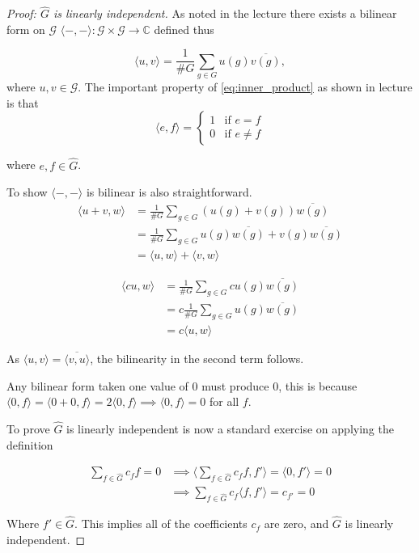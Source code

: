 \documentclass{article}
\theoremstyle{definition}
\theoremstyle{definition}
\theoremstyle{remark}
\newcommand{\bb}[1]{\mathbb{#1}} %
\renewcommand{\hat}[1]{\widehat{#1}}
\newcommand{\G}{\mathcal{G}}
\newcommand{\hG}{\hat{G}}
\begin{document}
\begin{proof}[Proof: $\hG$ is linearly independent]
	As noted in the lecture there exists a bilinear form on $\G$ $\langle -, - \rangle: \G \times \G \rightarrow \bb{C}$ defined thus

	\begin{equation}\label{eq:inner_product}
		\langle u, v \rangle = \frac{1}{\#G} \sum_{g \in G} u(g) \overline{v(g)},
	\end{equation}
	where $u, v \in \G$.
	The important property of \ref{eq:inner_product} as shown in lecture is that 
	$$
	 \langle e, f \rangle = 
	 \begin{cases}
		1 & \text{if } e = f\\ 
		0 & \text{if } e \neq f
	 \end{cases}
	$$

	where $e, f \in \hG$. 

	To show $\langle -, - \rangle$ is bilinear is also straightforward. 
	$$
	\begin{aligned}
		\langle u + v, w \rangle &= \frac{1}{\#G} \sum_{g \in G} (u(g) + v(g)) \overline{w(g)} \\
		&= \frac{1}{\#G} \sum_{g \in G} u(g) \overline{w(g)} + v(g) \overline{w(g)} \\
		&= \langle u, w \rangle + \langle v, w \rangle
	\end{aligned}
	$$

	$$
	\begin{aligned}
		\langle cu, w \rangle &= \frac{1}{\#G} \sum_{g \in G} c u(g) \overline{w(g)} \\
		&= c \frac{1}{\#G} \sum_{g \in G} u(g) \overline{w(g)} \\
		&= c \langle u, w \rangle 
	\end{aligned}
	$$

	As $\langle u, v \rangle = \overline{\langle v, u \rangle}$, the bilinearity in the second term follows. 

	Any bilinear form taken one value of 0 must produce 0, this is because $\langle 0, f \rangle = \langle 0 + 0, f \rangle = 2 \langle 0, f \rangle \implies \langle 0, f \rangle = 0 $ for all $f$.

	To prove $\hG$ is linearly independent is now a standard exercise on applying the definition

	\begin{align*} 
		\sum_{f \in \hG} c_f f = 0 
		&\implies \langle \sum_{f \in \hG} c_f f, f' \rangle = \langle 0, f' \rangle = 0 \\
		&\implies \sum_{f \in \hG} c_f \langle f, f' \rangle =
		 c_{f'} = 0
	\end{align*}

	Where $f' \in \hG$. This implies all of the coefficients $c_f$ are zero, and $\hG$ is linearly independent.
\end{proof}
\end{document}

